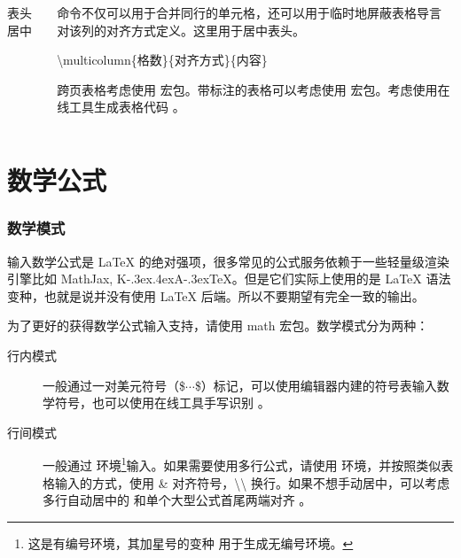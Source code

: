 \begin{shadedsection}
\begin{frame}[fragile]
\begin{columns}
\begin{column}{0.6\textwidth}
\begin{codeblock}[]{表头居中}
      \end{codeblock}
    \end{column}
    \begin{column}{0.4\textwidth}
       命令不仅可以用于合并同行的单元格，还可以用于临时地屏蔽表格导言对该列的对齐方式定义。这里用于居中表头。
      \begin{center}
        \parbox{0.85\linewidth}{
          \ttfamily\color{blue}\textbackslash{}multicolumn\{格数\}\{对齐方式\}\{内容\}
        }
      \end{center}
      跨页表格考虑使用  宏包。带标注的表格可以考虑使用  宏包。考虑使用在线工具生成表格代码 。
    \end{column}
  \end{columns}
\end{frame}

\section{数学公式}
\begin{frame}
  \frametitle{数学模式}
  \begin{alertblock}{}
  输入数学公式是 \LaTeX{} 的绝对强项，很多常见的公式服务依赖于一些轻量级渲染引擎比如 MathJax, K\kern-.3ex\raise.4ex\hbox{\footnotesize A}\kern-.3ex\TeX{}。但是它们实际上使用的是 \LaTeX{} 语法变种，也就是说并没有使用 \LaTeX{} 后端。所以不要期望有完全一致的输出。
  \end{alertblock}
  
  为了更好的获得数学公式输入支持，请使用 math 宏包。数学模式分为两种：
  \begin{description}
    \item[行内模式] 一般通过一对美元符号（\$$\cdots$\$）标记，可以使用编辑器内建的符号表输入数学符号，也可以使用在线工具手写识别 。
    \item[行间模式] 一般通过  环境\footnote{这是有编号环境，其加星号的变种  用于生成无编号环境。}输入。如果需要使用多行公式，请使用  环境，并按照类似表格输入的方式，使用 \& 对齐符号，\textbackslash\textbackslash{} 换行。如果不想手动居中，可以考虑多行自动居中的  和单个大型公式首尾两端对齐 。
  \end{description}
\end{frame}


\end{shadedsection}
